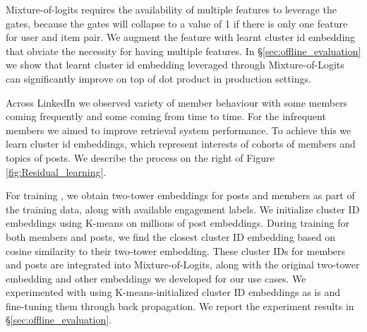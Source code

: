 Mixture-of-logits requires the availability of multiple features to leverage the gates, because the gates will collapse to a value of 1 if there is only one feature for user and item pair. We augment the feature with learnt cluster id embedding that obviate the necessity for having multiple features.
In \S\ref{sec:offline_evaluation} we show that learnt cluster id embedding leveraged through Mixture-of-Logits
can significantly improve on top of dot product in production settings.

Across LinkedIn we observed variety of member behaviour with some members coming frequently and some coming from time to time. For the infrequent members we aimed to improve retrieval system performance. To achieve this we learn cluster id embeddings, which represent interests of cohorts of members and topics of posts. We describe the process on the right of Figure \ref{fig:Residual_learning}. 


For training {\systemname}, we obtain two-tower embeddings for posts and members as part of the training data, along with available engagement labels. We initialize cluster ID embeddings using K-means on millions of post embeddings. During training for both members and posts, we find the closest cluster ID embedding based on cosine similarity to their two-tower embedding. These cluster IDs for members and posts are integrated into Mixture-of-Logits, along with the original two-tower embedding and other embeddings we developed for our use cases. We experimented with using K-means-initialized cluster ID embeddings as is and fine-tuning them through back propagation. We report the experiment results in \S\ref{sec:offline_evaluation}.

